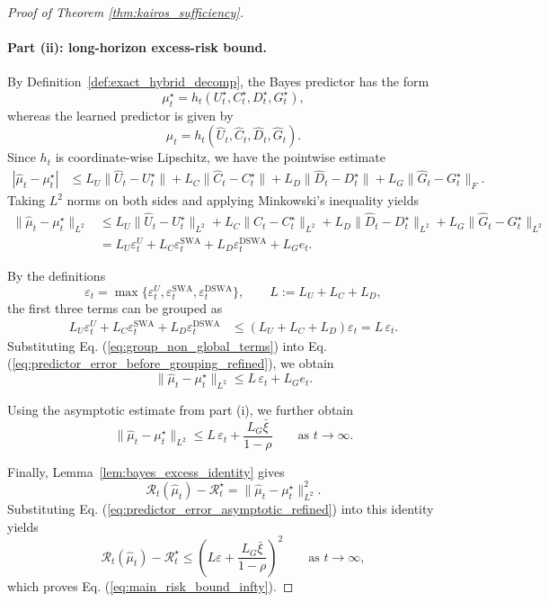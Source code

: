 \begin{proof}[Proof of Theorem \ref{thm:kairos_sufficiency}]
\paragraph{Part \textup{(ii)}: long-horizon excess-risk bound.}
By Definition~\ref{def:exact_hybrid_decomp}, the Bayes predictor has the form
\[
\mu_t^\star = h_t(U_t^\star,C_t^\star,D_t^\star,G_t^\star),
\]
whereas the learned predictor is given by
\[
\hat\mu_t = h_t(\hat U_t,\hat C_t,\hat D_t,\hat G_t).
\]
Since $h_t$ is coordinate-wise Lipschitz, we have the pointwise estimate
\begin{align}
|\hat\mu_t-\mu_t^\star|
&\le
L_U\|\hat U_t-U_t^\star\|
+
L_C\|\hat C_t-C_t^\star\|
+
L_D\|\hat D_t-D_t^\star\|
+
L_G\|\hat G_t-G_t^\star\|_F.
\label{eq:pointwise_decoder_bound_refined}
\end{align}
Taking $L^2$ norms on both sides and applying Minkowski's inequality yields
\begin{align}
\|\hat\mu_t-\mu_t^\star\|_{L^2}
&\le
L_U\|\hat U_t-U_t^\star\|_{L^2}
+
L_C\|\hat C_t-C_t^\star\|_{L^2}
+
L_D\|\hat D_t-D_t^\star\|_{L^2}
+
L_G\|\hat G_t-G_t^\star\|_{L^2}
\nonumber\\
&=
L_U\varepsilon_t^U
+
L_C\varepsilon_t^{\mathrm{SWA}}
+
L_D\varepsilon_t^{\mathrm{DSWA}}
+
L_G e_t.
\label{eq:predictor_error_before_grouping_refined}
\end{align}

By the definitions
\[
\varepsilon_t
=
\max\!\bigl\{\varepsilon_t^U,\varepsilon_t^{\mathrm{SWA}},\varepsilon_t^{\mathrm{DSWA}}\bigr\},
\qquad
L:=L_U+L_C+L_D,
\]
the first three terms can be grouped as
\begin{align}
L_U\varepsilon_t^U
+
L_C\varepsilon_t^{\mathrm{SWA}}
+
L_D\varepsilon_t^{\mathrm{DSWA}}
&\le
(L_U+L_C+L_D)\varepsilon_t
=
L\,\varepsilon_t.
\label{eq:group_non_global_terms}
\end{align}
Substituting Eq. (\ref{eq:group_non_global_terms}) into Eq. (\ref{eq:predictor_error_before_grouping_refined}), we obtain
\begin{equation}
\|\hat\mu_t-\mu_t^\star\|_{L^2}
\le
L\,\varepsilon_t + L_G e_t.
\label{eq:predictor_error_grouped_refined}
\end{equation}

Using the asymptotic estimate from part \textup{(i)}, we further obtain
\begin{equation}
\|\hat\mu_t-\mu_t^\star\|_{L^2}
\le
L\,\varepsilon_t + \frac{L_G\bar\xi}{1-\rho}
\qquad \text{as } t\to\infty.
\label{eq:predictor_error_asymptotic_refined}
\end{equation}


Finally, Lemma~\ref{lem:bayes_excess_identity} gives
\[
\mathcal R_t(\hat\mu_t)-\mathcal R_t^\star
=
\|\hat\mu_t-\mu_t^\star\|_{L^2}^2.
\]
Substituting Eq. (\ref{eq:predictor_error_asymptotic_refined}) into this identity yields
\begin{equation}
\mathcal R_t(\hat\mu_t)-\mathcal R_t^\star
\le
\left(
L\varepsilon+\frac{L_G\bar\xi}{1-\rho}
\right)^2
\qquad \text{as } t\to\infty,
\label{eq:final_risk_bound_refined}
\end{equation}
which proves Eq. (\ref{eq:main_risk_bound_infty}).
\end{proof}

